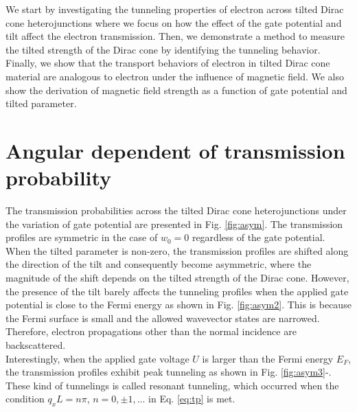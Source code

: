 We start by investigating the tunneling properties of electron across tilted Dirac cone heterojunctions where we focus on how
the effect of the gate potential and tilt affect the electron transmission.  
Then, we demonstrate a method to measure the tilted strength of the Dirac cone by identifying the tunneling behavior.
Finally, we show that the transport behaviors of electron in tilted Dirac cone material are analogous to electron under
the influence of magnetic field. We also show the derivation of magnetic field strength as a function of gate potential and tilted parameter.


\section{Angular dependent of transmission probability} \label{sec:asym}
    The transmission probabilities across the tilted Dirac cone heterojunctions under the variation of gate potential are presented in Fig. \ref{fig:asym}.
    The transmission profiles are symmetric in the case of $w_0 = 0$ regardless of the gate potential. 
    When the tilted parameter is non-zero, the transmission profiles are shifted along the direction of the tilt and consequently become asymmetric, where the magnitude of the shift depends on the tilted strength of the Dirac cone.
    However, the presence of the tilt barely affects the tunneling profiles when the applied gate potential is close to the Fermi energy as shown in Fig. \ref{fig:asym2}.
    This is because the Fermi surface is small and the allowed wavevector states are narrowed. Therefore, electron propagations other than the normal incidence are backscattered.\\
    
    Interestingly, when the applied gate voltage $U$ is larger than the Fermi energy $E_F$, the transmission profiles exhibit peak tunneling as shown in Fig. \ref{fig:asym3}-.
    These kind of tunnelings is called resonant tunneling, which occurred when the condition $q_x L = n \pi$, $n = 0, \pm1,...$ in Eq. \ref{eq:tp} is met.
    
